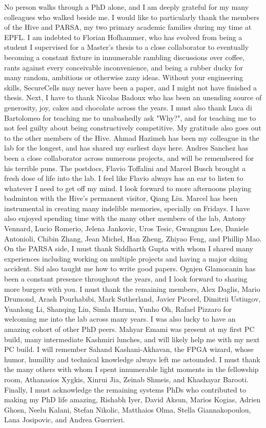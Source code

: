 No person walks through a PhD alone, and I am deeply grateful for my
many colleagues who walked beside me.
I would like to particularly thank the members of the Hive and PARSA, my two 
primary academic families during my time at EPFL. 
I am indebted to Florian Hofhammer, who has evolved from being a
student I supervised for a Master's thesis to a close collaborator to
eventually becoming a constant fixture in 
innumerable rambling discussions over coffee,
rants against every conceivable inconvenience, and 
being a rubber ducky for many random, ambitious or otherwise zany ideas.
Without your engineering skills, SecureCells may never have been a
paper, and I might not have finished a thesis.
Next, I have to thank Nicolas Badoux who has been an unending source of generosity, 
joy, cakes and chocolate across the years.
I must also thank Luca di Bartolomeo for teaching me to unabashedly ask "Why?",
and for teaching me to not feel guilty about being constructively competitive.
My gratitude also goes out to the other members of the Hive.
Ahmad Hazimeh has been my colleague in the lab for the longest, and has 
shared my earliest days here.
Andres Sanchez has been a close collaborator across numerous projects, and
will be remembered for his terrible puns.
The postdocs, Flavio Toffalini and Marcel Busch brought a fresh dose of life into the lab. 
I feel like Flavio always has an ear to listen to whatever I need to get off my mind.
I look forward to more afternoons playing badminton with the Hive's permanent
visitor, Qiang Liu.
Marcel has been instrumental in creating many indelible memories, 
specially on Fridays.
I have also enjoyed spending time with the many other members of the lab, 
Antony Vennard, Lucio Romerio, Jelena Jankovic, Uros Tesic, Gwangmu Lee,
Daniele Antonioli,
Chibin Zhang, Jean Michel, Han Zheng, Zhiyao Feng, and Phillip Mao.
On the PARSA side, I must thank Siddharth Gupta with
whom I shared many experiences including  
working on multiple projects and having a major skiing accident.
Sid also taught me how to write good papers.
Ognjen Glamocanin has been a constant presence throughout the years, and I 
look forward to sharing more burgers with you.
I must thank the remaining members, Alex Daglis, Mario Drumond, Arash Pourhabibi,
Mark Sutherland, Javier Picorel, Dimitrii Ustiugov,
Yuanlong Li, Shanqing Lin, Simla Harma, Yunho Oh, Rafael Pizzaro 
for welcoming me into the lab across many years.
I was also lucky to have an amazing cohort of other PhD peers.
Mahyar Emami was present at my first PC build, many intermediate Kashmiri lunches,
and will likely help me with my next PC build.
I will remember Sahand Kashani-Akhavan, the FPGA wizard, whose humor, 
humility and technical knowledge always left me astounded.
I must thank the many others with whom I spent innumerable light
moments in the fellowship room, Athanasios Xygkis, Xinrui Jia, 
Zeinab Shmeis, and Khashayar Barooti.
Finally, I must acknowledge the remaining systems PhDs who contributed to
making my PhD life amazing, Rishabh Iyer, David Aksun, Marios Kogias, Adrien Ghosn,
Neelu Kalani, Stefan Nikolic, Matthaios Olma, Stella Giannakopoulou,
Lana Josipovic,  and Andrea Guerrieri. 

